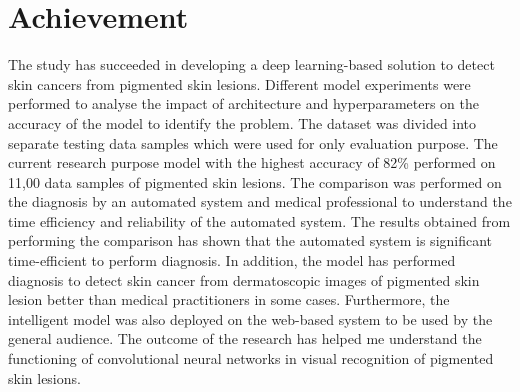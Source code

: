 \section{Achievement}
The study has succeeded in developing a deep learning-based solution to detect skin cancers from pigmented skin lesions.
Different model experiments were performed to analyse the impact of architecture and hyperparameters on the accuracy of the model to identify the problem. 
The dataset was divided into separate testing data samples which were used for only evaluation purpose. The current research purpose model with the highest accuracy of 82\% performed on 11,00 data samples of pigmented skin lesions. 
The comparison was performed on the diagnosis by an automated system and medical professional to understand the time efficiency and reliability of the automated system. 
The results obtained from performing the comparison has shown that the automated system is significant time-efficient to perform diagnosis. 
In addition, the model has performed diagnosis to detect skin cancer from dermatoscopic images of pigmented skin lesion better than medical practitioners in some cases.
Furthermore, the intelligent model was also deployed on the web-based system to be used by the general audience. The outcome of the research has helped me understand the functioning of convolutional neural networks in visual recognition of pigmented skin lesions.